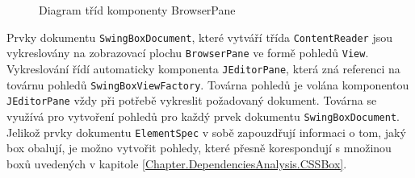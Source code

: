 \begin{figure}[H]
  \begin{center}
    \caption{Diagram tříd komponenty BrowserPane}
    \label{Figure.SwingBoxDesign}
  \end{center}
\end{figure}

Prvky dokumentu \texttt{SwingBoxDocument}, které vytváří třída \texttt{ContentReader} jsou vykreslovány na zobrazovací plochu \texttt{BrowserPane} ve formě pohledů \texttt{View}. Vykreslování řídí automaticky komponenta \texttt{JEditorPane}, která zná referenci na továrnu pohledů \texttt{SwingBoxViewFactory}. Továrna pohledů je volána komponentou \texttt{JEditorPane} vždy při potřebě vykreslit požadovaný dokument. Továrna se využívá pro vytvoření pohledů pro každý prvek dokumentu \texttt{SwingBoxDocument}. Jelikož prvky dokumentu \texttt{ElementSpec} v sobě zapouzdřují informaci o tom, jaký box obalují, je možno vytvořit pohledy, které přesně korespondují s množinou boxů uvedených v kapitole \ref{Chapter.DependenciesAnalysis.CSSBox}.

